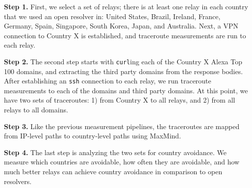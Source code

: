 {\bf Step 1.}  First, we select a set of relays; there is at least one relay in each country that we used an open resolver in: United States, Brazil, Ireland, France, Germany, Spain, Singapore, South Korea, Japan, and Australia.  Next, a VPN connection to Country X is established, and traceroute measurements are run to each relay.

{\bf Step 2.}  The second step starts with {\tt curl}ing each of the Country X Alexa Top 100 domains, and extracting the third party domains from the response bodies.  After establishing an {\tt ssh} connection to each relay, we run traceroute measurements to each of the domains and third party domains.  At this point, we have two sets of traceroutes: 1) from Country X to all relays, and 2) from all relays to all domains.

{\bf Step 3.}  Like the previous measurement pipelines, the traceroutes are mapped from IP-level paths to country-level paths using MaxMind.

{\bf Step 4.}  The last step is analyzing the two sets for country avoidance.  We measure which countries are avoidable, how often they are avoidable, and how much better relays can achieve country avoidance in comparison to open resolvers.
